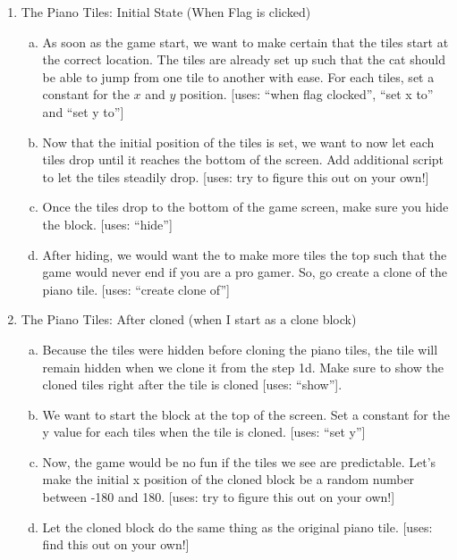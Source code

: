 \documentclass[11pt]{article}
\begin{document}
\begin{enumerate}
\item The Piano Tiles: Initial State (When Flag is clicked)

\begin{enumerate}[a.]
\item As soon as the game start, we want to make certain that the tiles start at the correct location. The tiles are already set up such that the cat should be able to jump from one tile to another with ease. For each tiles, set a constant for the $x$ and $y$ position. [uses: ``when flag clocked'', ``set x to'' and ``set y to'']

\item Now that the initial position of the tiles is set, we want to now let each tiles drop until it reaches the bottom of the screen. Add additional script to let the tiles steadily drop. [uses: try to figure this out on your own!]
\item Once the tiles drop to the bottom of the game screen, make sure you hide the block. [uses: ``hide'']
\item After hiding, we would want the to make more tiles the top such that the game would never end if you are a pro gamer. So, go create a clone of the piano tile. [uses: ``create clone of'']
\end{enumerate}

\item The Piano Tiles: After cloned (when I start as a clone block)
\begin{enumerate}[a.]
\item Because the tiles were hidden before cloning the piano tiles, the tile will remain hidden when we clone it from the step 1d. Make sure to show the cloned tiles right after the tile is cloned [uses: ``show''].

\item We want to start the block at the top of the screen. Set a constant for the y value for each tiles when the tile is cloned. [uses: ``set y'']

\item Now, the game would be no fun if the tiles we see are predictable. Let's make the initial x position of the cloned block be a random number between -180 and 180. [uses: try to figure this out on your own!]

\item Let the cloned block do the same thing as the original piano tile. [uses: find this out on your own!]
\end{enumerate}


\end{enumerate}
\end{document}
